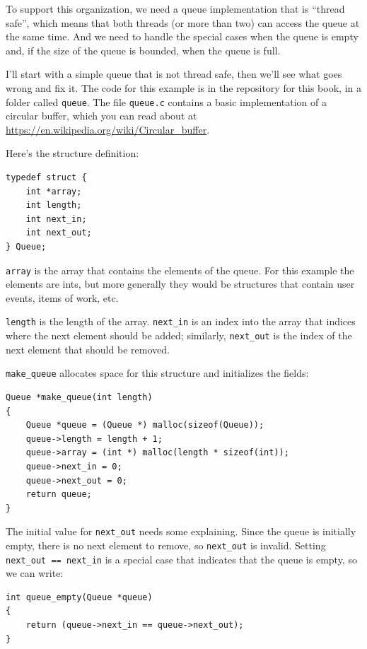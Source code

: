 \documentclass[12pt]{book}
\begin{document}
{To support this organization, we need a queue implementation that is
``thread safe'', which means that both threads (or more than two) can
access the queue at the same time.  And we need to handle the special
cases when the queue is empty and, if the size of the queue is
bounded, when the queue is full.

I'll start with a simple queue that is not thread safe, then we'll see
what goes wrong and fix it.  The code for this example is in the
repository for this book, in a folder called {\tt queue}.  The file
{\tt queue.c} contains a basic implementation of a circular buffer,
which you can read about at
\url{https://en.wikipedia.org/wiki/Circular_buffer}.

Here's the structure definition:

\begin{verbatim}
typedef struct {
    int *array;
    int length;
    int next_in;
    int next_out;
} Queue;
\end{verbatim}

{\tt array} is the array that contains the elements of the queue.
For this example the elements are ints, but more generally
they would be structures that contain user events, items of work, etc.

{\tt length} is the length of the array.  \verb"next_in" is an
index into the array that indices where the next element should be
added; similarly, \verb"next_out" is the index of the next element
that should be removed.

\verb"make_queue" allocates space for this structure and initializes
the fields:

\begin{verbatim}
Queue *make_queue(int length)
{
    Queue *queue = (Queue *) malloc(sizeof(Queue));
    queue->length = length + 1;
    queue->array = (int *) malloc(length * sizeof(int));
    queue->next_in = 0;
    queue->next_out = 0;
    return queue;
}
\end{verbatim}

The initial value for \verb"next_out" needs some explaining.
Since the queue is initially empty, there is no next element to
remove, so \verb"next_out" is invalid.  Setting
\verb"next_out == next_in" is a special case that indicates
that the queue is empty, so we can write:

\begin{verbatim}
int queue_empty(Queue *queue)
{
    return (queue->next_in == queue->next_out);
}
\end{verbatim}

}
\end{document}
